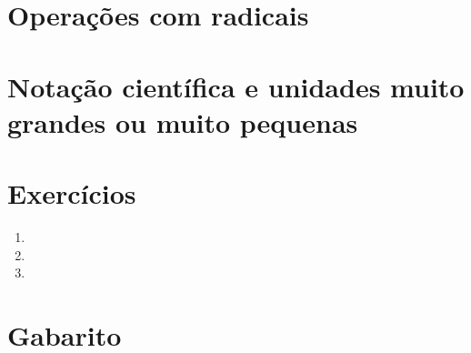 \documentclass[11pt,a4paper]{article}
\begin{document}
\section{Operações com radicais}

\section{Notação científica e unidades muito grandes ou muito pequenas}


\section{Exercícios}
\begin{enumerate}[label=\textbf{\arabic*.}]
  \item %
  \item %
  \item %
\end{enumerate}

\begin{desafio}
\end{desafio}

\section*{Gabarito}
\end{document}
